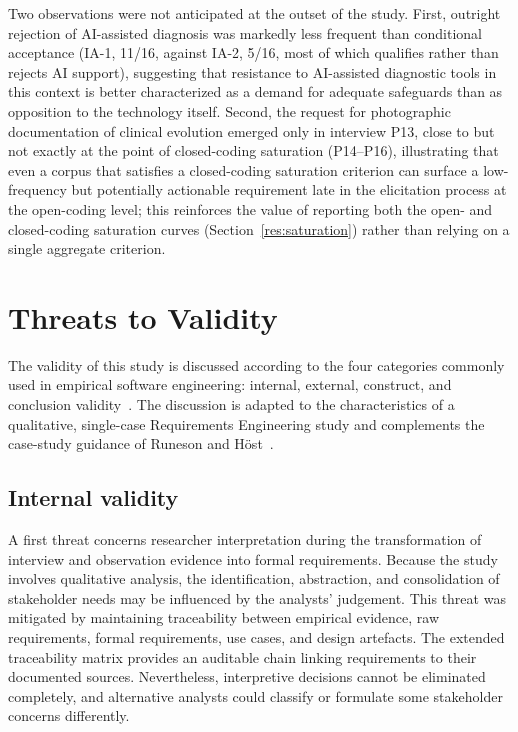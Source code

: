 \documentclass[pdflatex,sn-mathphys-num,Numbered]{sn-jnl}
\begin{document}
Two observations were not anticipated at the outset of the study. First, outright rejection of AI-assisted diagnosis was markedly less frequent than conditional acceptance (IA-1, 11/16, against IA-2, 5/16, most of which qualifies rather than rejects AI support), suggesting that resistance to AI-assisted diagnostic tools in this context is better characterized as a demand for adequate safeguards than as opposition to the technology itself. Second, the request for photographic documentation of clinical evolution emerged only in interview P13, close to but not exactly at the point of closed-coding saturation (P14--P16), illustrating that even a corpus that satisfies a closed-coding saturation criterion can surface a low-frequency but potentially actionable requirement late in the elicitation process at the open-coding level; this reinforces the value of reporting both the open- and closed-coding saturation curves (Section~\ref{res:saturation}) rather than relying on a single aggregate criterion.


\section{Threats to Validity}\label{sec6}

The validity of this study is discussed according to the four categories commonly used in empirical software engineering: internal, external, construct, and conclusion validity~\cite{wohlin2012,siegmund2015}. The discussion is adapted to the characteristics of a qualitative, single-case Requirements Engineering study and complements the case-study guidance of Runeson and H\"ost~\cite{runeson2009}.

\subsection{Internal validity}\label{tv:internal}

A first threat concerns researcher interpretation during the transformation of interview and observation evidence into formal requirements. Because the study involves qualitative analysis, the identification, abstraction, and consolidation of stakeholder needs may be influenced by the analysts' judgement. This threat was mitigated by maintaining traceability between empirical evidence, raw requirements, formal requirements, use cases, and design artefacts. The extended traceability matrix provides an auditable chain linking requirements to their documented sources. Nevertheless, interpretive decisions cannot be eliminated completely, and alternative analysts could classify or formulate some stakeholder concerns differently.
\end{document}
